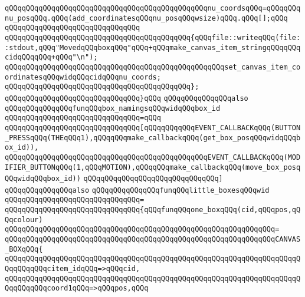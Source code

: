 \verb|qQQqqQQqqQQqqQQqqQQqqQQqqQQqqQQqqQQqqQQqqQQqqQQqnu_coordsqQQq=qQQqqQQqnu_posqQQq.qQQq(add_coordinatesqQQqnu_posqQQqwsize)qQQq.qQQq[];qQQq|\newline
\verb|qQQqqQQqqQQqqQQqqQQqqQQqqQQqqQQq|\newline
\verb|qQQqqQQqqQQqqQQqqQQqqQQqqQQqqQQqqQQqqQQqqQQq{qQQqfile::writeqQQq(file::stdout,qQQq"MovedqQQqboxqQQq"qQQq+qQQqmake_canvas_item_stringqQQqqQQqcidqQQqqQQq+qQQq"\n");|\newline
\verb|qQQqqQQqqQQqqQQqqQQqqQQqqQQqqQQqqQQqqQQqqQQqqQQqqQQqset_canvas_item_coordinatesqQQqwidqQQqcidqQQqnu_coords;|\newline
\verb|qQQqqQQqqQQqqQQqqQQqqQQqqQQqqQQqqQQqqQQqqQQq};|\newline
\verb|qQQqqQQqqQQqqQQqqQQqqQQqqQQqqQQq}qQQq|\newline
\newline
\verb|qQQqqQQqqQQqqQQqalso|\newline
\verb|qQQqqQQqqQQqqQQqfunqQQqbox_namingsqQQqwidqQQqbox_id|\newline
\verb|qQQqqQQqqQQqqQQqqQQqqQQqqQQqqQQq=qQQq|\newline
\verb|qQQqqQQqqQQqqQQqqQQqqQQqqQQqqQQq[qQQqqQQqqQQqEVENT_CALLBACKqQQq(BUTTON_PRESSqQQq(THEqQQq1),qQQqqQQqmake_callbackqQQq(get_box_posqQQqwidqQQqbox_id)),|\newline
\verb|qQQqqQQqqQQqqQQqqQQqqQQqqQQqqQQqqQQqqQQqqQQqqQQqEVENT_CALLBACKqQQq(MODIFIER_BUTTONqQQq(1,qQQqMOTION),qQQqqQQqmake_callbackqQQq(move_box_posqQQqwidqQQqbox_id))|\newline
\verb|qQQqqQQqqQQqqQQqqQQqqQQqqQQqqQQq]|\newline
\newline
\verb|qQQqqQQqqQQqqQQqalso|\newline
\verb|qQQqqQQqqQQqqQQqfunqQQqlittle_boxesqQQqwid|\newline
\verb|qQQqqQQqqQQqqQQqqQQqqQQqqQQqqQQq=|\newline
\verb|qQQqqQQqqQQqqQQqqQQqqQQqqQQqqQQq{qQQqfunqQQqone_boxqQQq(cid,qQQqpos,qQQqcolour)|\newline
\verb|qQQqqQQqqQQqqQQqqQQqqQQqqQQqqQQqqQQqqQQqqQQqqQQqqQQqqQQqqQQqqQQq=|\newline
\verb|qQQqqQQqqQQqqQQqqQQqqQQqqQQqqQQqqQQqqQQqqQQqqQQqqQQqqQQqqQQqqQQqCANVAS_BOXqQQq{|\newline
\verb|qQQqqQQqqQQqqQQqqQQqqQQqqQQqqQQqqQQqqQQqqQQqqQQqqQQqqQQqqQQqqQQqqQQqqQQqqQQqqQQqcitem_idqQQq=>qQQqcid,|\newline
\verb|qQQqqQQqqQQqqQQqqQQqqQQqqQQqqQQqqQQqqQQqqQQqqQQqqQQqqQQqqQQqqQQqqQQqqQQqqQQqqQQqcoord1qQQq=>qQQqpos,qQQq|\newline

